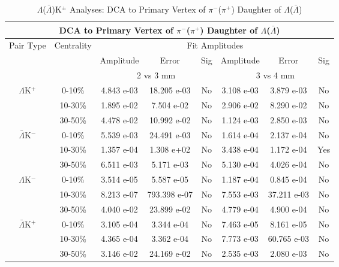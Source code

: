 \documentclass[../AnalysisNoteJBuxton.tex]{subfiles}
\begin{document}
\begin{table}
 \centering
 \begin{tabular}{|c|c|c|c|c||c|c|c|}
  \multicolumn{8}{c}{DCA to Primary Vertex of $\pi^{-}$($\pi^{+}$) Daughter of $\Lambda$($\bar{\Lambda}$)} \\
  \hline
  \multirow{3}{*}{Pair Type} & \multirow{3}{*}{Centrality} & \multicolumn{6}{c|}{Fit Amplitudes} \\
  \cline{3-8}
   & & Amplitude & Error & Sig & Amplitude & Error & Sig \\  
  \cline{3-8}
   & & \multicolumn{3}{c||}{2 vs 3 mm} & \multicolumn{3}{c|}{3 vs 4 mm} \\  
  \hline
  \multirow{3}{*}{$\Lambda$K$^{+}$}
   &  0-10\% & 4.843 e-03 & 18.205 e-03 & No & 3.108 e-03 & 3.879 e-03 & No \\
   & 10-30\% & 1.895 e-02 & 7.504 e-02 & No & 2.906 e-02 & 8.290 e-02 & No \\
   & 30-50\% & 4.478 e-02 & 10.992 e-02 & No & 1.124 e-03 & 2.850 e-03 & No \\
  \hline
  \multirow{3}{*}{$\bar{\Lambda}$K$^{-}$}
   &  0-10\% & 5.539 e-03 & 24.491 e-03 & No & 1.614 e-04 & 2.137 e-04 & No \\
   & 10-30\% & 1.357 e-04 & 1.308 e+02 & No & 3.438 e-04 & 1.172 e-04 & Yes \\
   & 30-50\% & 6.511 e-03 & 5.171 e-03 & No & 5.130 e-04 & 4.026 e-04 & No \\
  \hline \hline
  \multirow{3}{*}{$\Lambda$K$^{-}$}
   &  0-10\% & 3.514 e-05 & 5.587 e-05 & No & 1.187 e-04 & 0.845 e-04 & No \\
   & 10-30\% & 8.213 e-07 & 793.398 e-07 & No & 7.553 e-03 & 37.211 e-03 & No \\
   & 30-50\% & 4.040 e-02 & 23.899 e-02 & No & 4.779 e-04 & 4.900 e-04 & No \\
  \hline
  \multirow{3}{*}{$\bar{\Lambda}$K$^{+}$}
   &  0-10\% & 3.105 e-04 & 3.344 e-04 & No & 7.463 e-05 & 8.161 e-05 & No \\
   & 10-30\% & 4.365 e-04 & 3.362 e-04 & No & 7.773 e-03 & 60.765 e-03 & No \\
   & 30-50\% & 3.146 e-02 & 24.169 e-02 & No & 2.535 e-03 & 2.080 e-03 & No \\
  \hline
 \end{tabular}
 \caption{$\Lambda$($\bar{\Lambda}$)K$^{\pm}$ Analyses: DCA to Primary Vertex of $\pi^{-}$($\pi^{+}$) Daughter of $\Lambda$($\bar{\Lambda}$)}
 \label{tab:DcaToPrimVertexPionDaughtOfLamLamKch}
\end{table}
\end{document}
